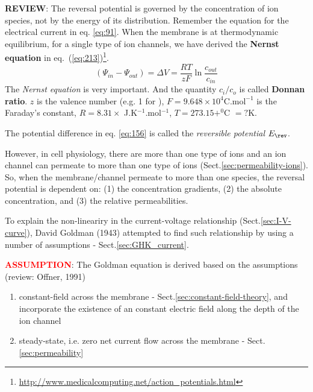 \begin{mdframed}

{\bf REVIEW}:
The reversal potential is governed by the concentration of ion species,
not by the energy of its distribution.  Remember the equation for the
electrical current in eq. \eqref{eq:91}. When the membrane is at
thermodynamic equilibrium, for a single type of ion channels, we have
derived the {\bf Nernst equation} in
eq.~(\ref{eq:213})\footnote{\url{http://www.medicalcomputing.net/action\_potentials.html}}.
\begin{equation}
  \label{eq:156}
 (\Psi_{in} - \Psi_{out}) = \Delta V =  \frac{RT}{zF} \ln\frac{c_{out}}{c_{in}} 
\end{equation}
The {\it Nernst equation} is very important. And the quantity
$c_i/c_o$ is called {\bf Donnan ratio}.  $z$ is the valence number
(e.g. 1 for ), $F=9.648\times 10^4 \text{C.mol}^{-1}$ is the
Faraday's constant, $R = 8.31\times$ J.K$^{-1}$.mol$^{-1}$, $T =
273.15+^0$C $= ?$K.

The potential difference in eq. \eqref{eq:156} is called the {\it reversible
potential} $E_\rev$.

\end{mdframed}


However, in cell physiology, there are more than one type of ions and an ion
channel can permeate to more than one type of ions
(Sect.\ref{sec:permeability-ions}).  So, when the membrane/channel permeate to
more than one species, the reversal potential is dependent on: (1) the
concentration gradients, (2) the absolute concentration, and (3) the relative
permeabilities.

To explain the non-lineariry in the current-voltage relationship
(Sect.\ref{sec:I-V-curve}), David Goldman (1943) attempted to find such
relationship by using a number of assumptions - Sect.\ref{sec:GHK_current}.

\textcolor{red}{\bf ASSUMPTION}: The Goldman equation is derived based on the
assumptions (review: Offner, 1991)
\begin{enumerate}
  \item constant-field across the membrane -
  Sect.\ref{sec:constant-field-theory}, and incorporate the existence of an
  constant electric field along the depth of the ion channel

  \item steady-state, i.e. zero net current flow across the membrane -
  Sect.\ref{sec:permeability}
  
\end{enumerate}

